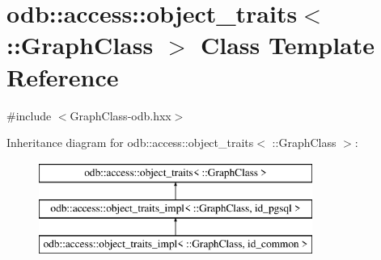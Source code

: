 \hypertarget{classodb_1_1access_1_1object__traits_3_01_1_1_graph_class_01_4}{}\section{odb\+:\+:access\+:\+:object\+\_\+traits$<$ \+:\+:Graph\+Class $>$ Class Template Reference}
\label{classodb_1_1access_1_1object__traits_3_01_1_1_graph_class_01_4}


{\ttfamily \#include $<$Graph\+Class-\/odb.\+hxx$>$}

Inheritance diagram for odb\+:\+:access\+:\+:object\+\_\+traits$<$ \+:\+:Graph\+Class $>$\+:\begin{figure}[H]
\begin{center}
\leavevmode
\includegraphics[height=3.000000cm]{d3/de0/classodb_1_1access_1_1object__traits_3_01_1_1_graph_class_01_4}
\end{center}
\end{figure}
